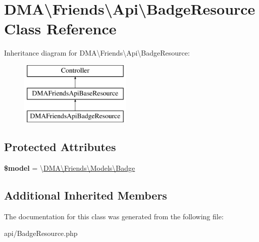 \hypertarget{classDMA_1_1Friends_1_1Api_1_1BadgeResource}{}\section{D\+M\+A\textbackslash{}Friends\textbackslash{}Api\textbackslash{}Badge\+Resource Class Reference}
\label{classDMA_1_1Friends_1_1Api_1_1BadgeResource}
Inheritance diagram for D\+M\+A\textbackslash{}Friends\textbackslash{}Api\textbackslash{}Badge\+Resource\+:\begin{figure}[H]
\begin{center}
\leavevmode
\includegraphics[height=3.000000cm]{d4/d95/classDMA_1_1Friends_1_1Api_1_1BadgeResource}
\end{center}
\end{figure}
\subsection*{Protected Attributes}
\begin{DoxyCompactItemize}
\item 
\hypertarget{classDMA_1_1Friends_1_1Api_1_1BadgeResource_ac4a608f9e0378780c36e0751eb346699}{}{\bfseries \$model} = \textquotesingle{}\textbackslash{}\hyperlink{classDMA_1_1Friends_1_1Models_1_1Badge}{D\+M\+A\textbackslash{}\+Friends\textbackslash{}\+Models\textbackslash{}\+Badge}\textquotesingle{}\label{classDMA_1_1Friends_1_1Api_1_1BadgeResource_ac4a608f9e0378780c36e0751eb346699}

\end{DoxyCompactItemize}
\subsection*{Additional Inherited Members}


The documentation for this class was generated from the following file\+:\begin{DoxyCompactItemize}
\item 
api/Badge\+Resource.\+php\end{DoxyCompactItemize}
